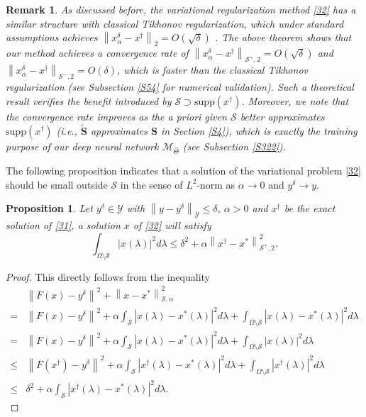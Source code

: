 \documentclass[11pt]{article}
\newcommand{\wih}{\widehat}
\newcommand{\wit}{\widetilde}
\newcommand{\bds}[1]{\boldsymbol{#1}}
\newtheorem{remark}{Remark}[section]
\newtheorem{prop}[theorem]{Proposition}
\begin{document}
\begin{remark}\rm\label{R4}
As discussed before, the variational regularization method \eqref{32} has a similar structure with classical Tikhonov regularization, which under standard assumptions achieves $ \left\|x_\alpha^\delta - x^\dagger\right\|_2 = O(\sqrt{\delta}) $ \cite{EHW96}.
The above theorem shows that our method achieves a convergence rate of $ \left\|x_\alpha^\delta - x^\dagger\right\|_{\mathcal{S}^+, 2} = O(\sqrt{\delta}) $ and $ \left\|x_\alpha^\delta - x^\dagger\right\|_{\mathcal{S}^-, 2} = O(\delta) $, which is faster than the classical Tikhonov regularization (see Subsection \ref{S54} for numerical validation).
Such a theoretical result verifies the benefit introduced by $ \mathcal{S}\supset\mathrm{supp}(x^\dagger) $.
Moreover, we note that the convergence rate improves as the \textit{a priori} given $\mathcal{S}$ better approximates $ \mathrm{supp}(x^\dagger) $ (i.e., $ \wit{\bds{S}} $ approximates $ \bds{S} $ in Section \ref{S4}), which is exactly the training purpose of our deep neural network $\mathcal{M}_{\wih{\Theta}}$ (see Subsection \ref{S322}).
\end{remark}

The following proposition indicates that a solution of the variational problem \eqref{32} should be small outside $\mathcal{S}$ in the sense of $ L^2 $-norm as $ \alpha\to 0 $ and $ y^\delta\to y $.

\begin{prop}\label{P1}
Let $ y^\delta\in \mathcal{Y} $ with $ \left\|y - y^\delta\right\|_\mathcal{Y}\leq \delta $, $ \alpha>0 $ and $ x^\dagger $ be the exact solution of \eqref{31}, a solution $ x $ of \eqref{32} will satisfy
\begin{displaymath}
\int_{\Omega\setminus\mathcal{S}}|x(\lambda)|^2d\lambda \leq \delta^2 + \alpha\left\|x^\dagger - x^*\right\|_{\mathcal{S}^+, 2}^2.
\end{displaymath}
\end{prop}
\begin{proof}
This directly follows from the inequality
\begin{displaymath}
\begin{aligned}
&\left\|F(x) - y^\delta\right\|^2 + \left\|x - x^*\right\|_{\mathcal{S}, \alpha}^2\\
=
&\left\|F(x) - y^\delta\right\|^2 + \alpha\int_{\mathcal{S}}|x(\lambda) - x^*(\lambda)|^2d\lambda + \int_{\Omega\setminus\mathcal{S}}|x(\lambda) - x^*(\lambda)|^2d\lambda\\
=
&\left\|F(x) - y^\delta\right\|^2 + \alpha\int_{\mathcal{S}}|x(\lambda) - x^*(\lambda)|^2d\lambda + \int_{\Omega\setminus\mathcal{S}}|x(\lambda)|^2d\lambda\\
\leq 
&\left\|F(x^\dagger) - y^\delta\right\|^2 + \alpha\int_{\mathcal{S}}|x^\dagger(\lambda) - x^*(\lambda)|^2d\lambda + \int_{\Omega\setminus\mathcal{S}}|x^\dagger(\lambda)|^2d\lambda\\
\leq
&\delta^2 + \alpha\int_{\mathcal{S}}|x^\dagger(\lambda) - x^*(\lambda)|^2d\lambda.
\end{aligned}
\end{displaymath}
\end{proof}
\end{document}

